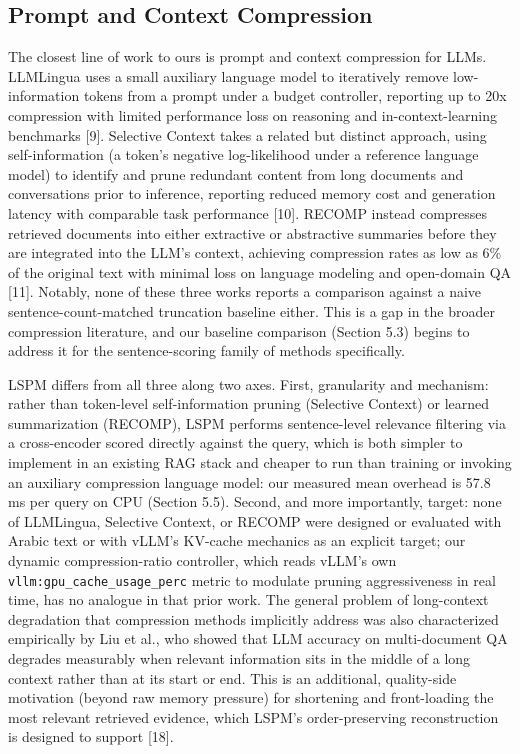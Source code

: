 \subsection{Prompt and Context Compression}
The closest line of work to ours is prompt and context compression for LLMs. LLMLingua uses a small auxiliary language model to iteratively remove low-information tokens from a prompt under a budget controller, reporting up to 20x compression with limited performance loss on reasoning and in-context-learning benchmarks [9]. Selective Context takes a related but distinct approach, using self-information (a token's negative log-likelihood under a reference language model) to identify and prune redundant content from long documents and conversations prior to inference, reporting reduced memory cost and generation latency with comparable task performance [10]. RECOMP instead compresses retrieved documents into either extractive or abstractive summaries before they are integrated into the LLM's context, achieving compression rates as low as 6\% of the original text with minimal loss on language modeling and open-domain QA [11]. Notably, none of these three works reports a comparison against a naive sentence-count-matched truncation baseline either. This is a gap in the broader compression literature, and our baseline comparison (Section 5.3) begins to address it for the sentence-scoring family of methods specifically.

LSPM differs from all three along two axes. First, granularity and mechanism: rather than token-level self-information pruning (Selective Context) or learned summarization (RECOMP), LSPM performs sentence-level relevance filtering via a cross-encoder scored directly against the query, which is both simpler to implement in an existing RAG stack and cheaper to run than training or invoking an auxiliary compression language model: our measured mean overhead is 57.8 ms per query on CPU (Section 5.5). Second, and more importantly, target: none of LLMLingua, Selective Context, or RECOMP were designed or evaluated with Arabic text or with vLLM's KV-cache mechanics as an explicit target; our dynamic compression-ratio controller, which reads vLLM's own \texttt{vllm:gpu\_cache\_usage\_perc} metric to modulate pruning aggressiveness in real time, has no analogue in that prior work. The general problem of long-context degradation that compression methods implicitly address was also characterized empirically by Liu et al., who showed that LLM accuracy on multi-document QA degrades measurably when relevant information sits in the middle of a long context rather than at its start or end. This is an additional, quality-side motivation (beyond raw memory pressure) for shortening and front-loading the most relevant retrieved evidence, which LSPM's order-preserving reconstruction is designed to support [18].

